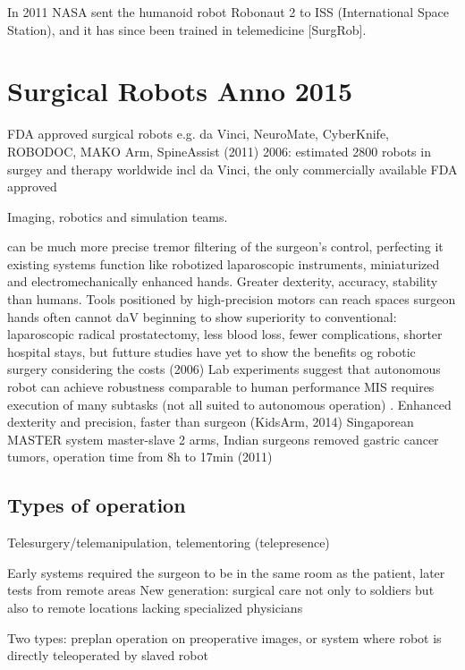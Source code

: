 In 2011 NASA sent the humanoid robot Robonaut 2 to ISS (International Space Station), and it has since been trained in telemedicine [SurgRob].







\section{Surgical Robots Anno 2015}
FDA approved surgical robots e.g. da Vinci, NeuroMate, CyberKnife, ROBODOC, MAKO Arm, SpineAssist (2011)
2006: estimated 2800 robots in surgey and therapy worldwide incl da Vinci, the only commercially available FDA approved

Imaging, robotics and simulation teams.

can be much more precise
tremor filtering of the surgeon's control, perfecting it
existing systems function like robotized laparoscopic instruments, miniaturized and electromechanically enhanced hands. Greater dexterity, accuracy, stability than humans. Tools positioned by high-precision motors can reach spaces surgeon hands often cannot \citep{bib:docatadist}
daV beginning to show superiority to  conventional: laparoscopic radical prostatectomy, less blood loss, fewer complications, shorter hospital stays, but futture studies have yet to show the benefits og robotic surgery considering the costs (2006) \citep{bib:docatadist}
Lab experiments suggest that autonomous robot can achieve robustness comparable to human performance \citep{bib:raven_debride}
MIS requires execution of many subtasks (not all suited to autonomous operation) \citep{bib:raven_debride}.
Enhanced dexterity and precision, faster than surgeon (KidsArm, 2014)
Singaporean MASTER system master-slave 2 arms, Indian surgeons removed gastric cancer tumors, operation time from 8h to 17min (2011)

\subsection{Types of operation}
Telesurgery/telemanipulation, telementoring (telepresence)

Early systems required the surgeon to be in the same room as the patient, later tests from remote areas
New generation: surgical care not only to soldiers but also to remote locations lacking specialized physicians

Two types: preplan operation on preoperative images, or system where robot is directly teleoperated by slaved robot

